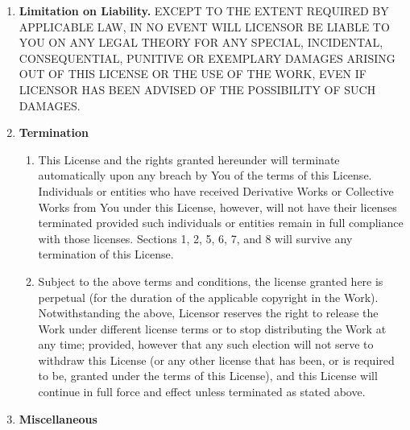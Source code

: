 \begin{enumerate}
\item \textbf{Limitation on Liability.} EXCEPT TO THE EXTENT REQUIRED
BY APPLICABLE LAW, IN NO EVENT WILL LICENSOR BE LIABLE TO YOU ON ANY
LEGAL THEORY FOR ANY SPECIAL, INCIDENTAL, CONSEQUENTIAL, PUNITIVE OR
EXEMPLARY DAMAGES ARISING OUT OF THIS LICENSE OR THE USE OF THE WORK,
EVEN IF LICENSOR HAS BEEN ADVISED OF THE POSSIBILITY OF SUCH DAMAGES.


\item \textbf{Termination}

\begin{enumerate}
\item This License and the rights granted hereunder will terminate
automatically upon any breach by You of the terms of this
License. Individuals or entities who have received Derivative Works or
Collective Works from You under this License, however, will not have
their licenses terminated provided such individuals or entities remain
in full compliance with those licenses. Sections 1, 2, 5, 6, 7, and 8
will survive any termination of this License.

\item Subject to the above terms and conditions, the license granted
here is perpetual (for the duration of the applicable copyright in the
Work). Notwithstanding the above, Licensor reserves the right to
release the Work under different license terms or to stop distributing
the Work at any time; provided, however that any such election will
not serve to withdraw this License (or any other license that has
been, or is required to be, granted under the terms of this License),
and this License will continue in full force and effect unless
terminated as stated above.
\end{enumerate}

\item \textbf{Miscellaneous}


\end{enumerate}
